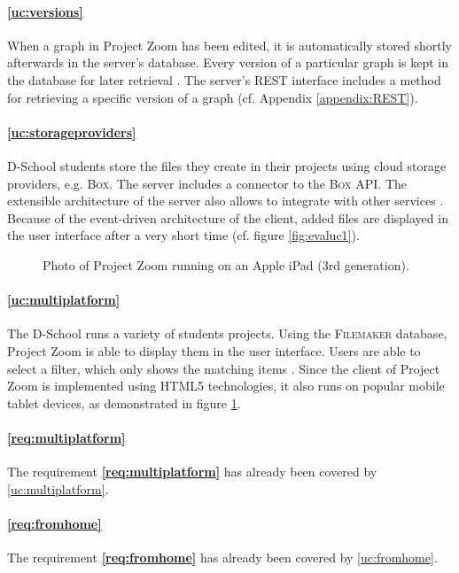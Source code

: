\paragraph{\ref{uc:versions}} When a graph in Project Zoom has been edited, it is automatically stored shortly afterwards in the server's database. Every version of a particular graph is kept in the database for later retrieval \cite{Bocklisch_2013}. The server's REST interface includes a method for retrieving a specific version of a graph (cf. Appendix \ref{appendix:REST}).

\paragraph{\ref{uc:storageproviders}} D-School students store the files they create in their projects using cloud storage providers, e.g. \textsc{Box}. The server includes a connector to the \textsc{Box} API. The extensible architecture of the server also allows to integrate with other services \cite{Werkmeister_2013}. Because of the event-driven architecture of the client, added files are displayed in the user interface after a very short time (cf. figure \ref{fig:evaluc1}).

\begin{figure}
\begin{center}
\caption{Photo of Project Zoom running on an Apple iPad (3rd generation).}
\label{fig:evaluc6}
\end{center}
\end{figure}

\paragraph{\ref{uc:multiplatform}} The D-School runs a variety of students projects. Using the \textsc{Filemaker} database, Project Zoom is able to display them in the user interface. Users are able to select a filter, which only shows the matching items \cite{Dieckhoff_2013}. Since the client of Project Zoom is implemented using HTML5 technologies, it also runs on popular mobile tablet devices, as demonstrated in figure \ref{fig:evaluc6}.

\paragraph{\ref{req:multiplatform}} The requirement \textbf{\ref{req:multiplatform}} has already been covered by \ref{uc:multiplatform}.
\paragraph{\ref{req:fromhome}} The requirement \textbf{\ref{req:fromhome}} has already been covered by \ref{uc:fromhome}.

